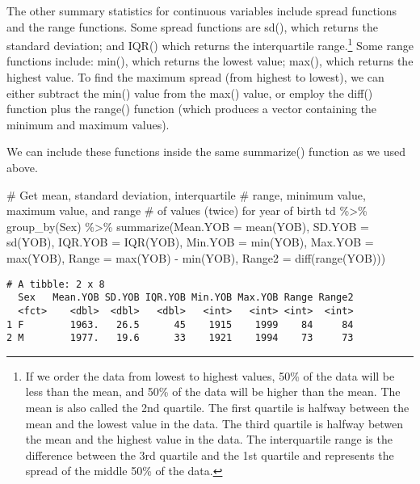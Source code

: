\documentclass[
  12pt,
  letterpaper]{article}
\newenvironment{Shaded}{\begin{snugshade}}{\end{snugshade}}
\newcommand{\AttributeTok}[1]{\textcolor[rgb]{0.40,0.45,0.13}{#1}}
\newcommand{\CommentTok}[1]{\textcolor[rgb]{0.37,0.37,0.37}{#1}}
\newcommand{\FunctionTok}[1]{\textcolor[rgb]{0.28,0.35,0.67}{#1}}
\newcommand{\NormalTok}[1]{\textcolor[rgb]{0.00,0.23,0.31}{#1}}
\newcommand{\SpecialCharTok}[1]{\textcolor[rgb]{0.37,0.37,0.37}{#1}}
\renewcommand\texttt[1]{{\ttfamily\color{BrickRed}#1}}
\begin{document}
The other summary statistics for continuous variables include spread
functions and the range functions. Some spread functions are
\texttt{sd()}, which returns the standard deviation; and \texttt{IQR()}
which returns the interquartile range.\footnote{If we order the data
  from lowest to highest values, 50\% of the data will be less than the
  mean, and 50\% of the data will be higher than the mean. The mean is
  also called the 2nd quartile. The first quartile is halfway between
  the mean and the lowest value in the data. The third quartile is
  halfway betwen the mean and the highest value in the data. The
  interquartile range is the difference between the 3rd quartile and the
  1st quartile and represents the spread of the middle 50\% of the data.}
Some range functions include: \texttt{min()}, which returns the lowest
value; \texttt{max()}, which returns the highest value. To find the
maximum spread (from highest to lowest), we can either subtract the
\texttt{min()} value from the \texttt{max()} value, or employ the
\texttt{diff()} function plus the \texttt{range()} function (which
produces a vector containing the minimum and maximum values).

We can include these functions inside the same \texttt{summarize()}
function as we used above.

\begin{Shaded}
\begin{Highlighting}[]
\CommentTok{\# Get mean, standard deviation, interquartile}
\CommentTok{\# range, minimum value, maximum value, and range}
\CommentTok{\# of values (twice) for year of birth}
\NormalTok{td }\SpecialCharTok{\%\textgreater{}\%}
    \FunctionTok{group\_by}\NormalTok{(Sex) }\SpecialCharTok{\%\textgreater{}\%}
    \FunctionTok{summarize}\NormalTok{(}\AttributeTok{Mean.YOB =} \FunctionTok{mean}\NormalTok{(YOB), }\AttributeTok{SD.YOB =} \FunctionTok{sd}\NormalTok{(YOB),}
        \AttributeTok{IQR.YOB =} \FunctionTok{IQR}\NormalTok{(YOB), }\AttributeTok{Min.YOB =} \FunctionTok{min}\NormalTok{(YOB), }\AttributeTok{Max.YOB =} \FunctionTok{max}\NormalTok{(YOB),}
        \AttributeTok{Range =} \FunctionTok{max}\NormalTok{(YOB) }\SpecialCharTok{{-}} \FunctionTok{min}\NormalTok{(YOB), }\AttributeTok{Range2 =} \FunctionTok{diff}\NormalTok{(}\FunctionTok{range}\NormalTok{(YOB)))}
\end{Highlighting}
\end{Shaded}

\begin{verbatim}
# A tibble: 2 x 8
  Sex   Mean.YOB SD.YOB IQR.YOB Min.YOB Max.YOB Range Range2
  <fct>    <dbl>  <dbl>   <dbl>   <int>   <int> <int>  <int>
1 F        1963.   26.5      45    1915    1999    84     84
2 M        1977.   19.6      33    1921    1994    73     73
\end{verbatim}
\end{document}
